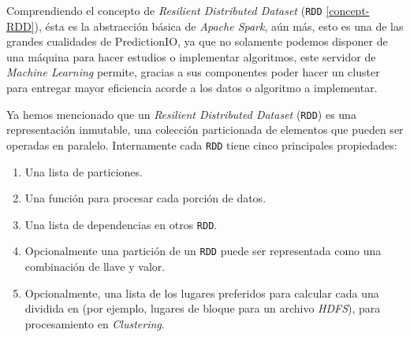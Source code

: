   Comprendiendo el concepto de \emph{Resilient Distributed Dataset} (\texttt{RDD} \ref{concept-RDD}), ésta es la abstracción básica de \emph{Apache Spark}, aún más, esto es una de las grandes cualidades de PredictionIO, ya que no solamente podemos disponer de una máquina para hacer estudios o implementar algoritmos, este servidor de \emph{Machine Learning} permite, gracias a sus componentes poder hacer un cluster para entregar mayor eficiencia acorde a los datos o algoritmo a implementar.

  Ya hemos mencionado que un \emph{Resilient Distributed Dataset} (\texttt{RDD}) es una representación inmutable, una colección particionada de elementos que pueden ser operadas en paralelo. Internamente cada \texttt{RDD} tiene cinco principales propiedades:


  \begin{enumerate}
    \item Una lista de particiones.
    \item Una función para procesar cada porción de datos.
    \item Una lista de dependencias en otros \texttt{RDD}. 
    \item Opcionalmente una partición de un \texttt{RDD} puede ser representada como una combinación de llave y valor. 
    \item Opcionalmente, una lista de los lugares preferidos para calcular cada una dividida en (por ejemplo, lugares de bloque para un archivo \emph{HDFS}), para procesamiento en \emph{Clustering}.

  \end{enumerate}
  




















